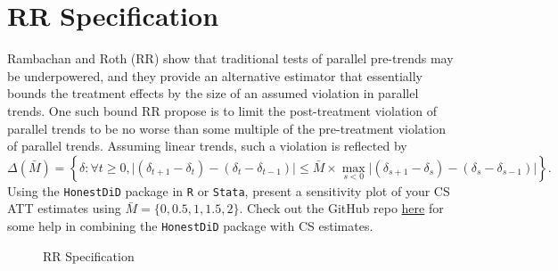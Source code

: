 \documentclass[
  12pt,
]{article}
\begin{document}
\newpage

\hypertarget{rr-specification}{%
\section{RR Specification}\label{rr-specification}}

Rambachan and Roth (RR) show that traditional tests of parallel
pre-trends may be underpowered, and they provide an alternative
estimator that essentially bounds the treatment effects by the size of
an assumed violation in parallel trends. One such bound RR propose is to
limit the post-treatment violation of parallel trends to be no worse
than some multiple of the pre-treatment violation of parallel trends.
Assuming linear trends, such a violation is reflected by
\[\Delta(\bar{M}) = \left\{ \delta : \forall t \geq 0, \lvert (\delta_{t+1} - \delta_{t}) - (\delta_{t} - \delta_{t-1}) \rvert \leq \bar{M} \times \max_{s<0} \lvert (\delta_{s+1} - \delta_{s}) - (\delta_{s} - \delta_{s-1}) \rvert \right\}.\]
Using the \texttt{HonestDiD} package in \texttt{R} or \texttt{Stata},
present a sensitivity plot of your CS ATT estimates using
\(\bar{M} = \{0, 0.5, 1, 1.5, 2\}\). Check out the GitHub repo
\href{https://github.com/pedrohcgs/CS_RR}{here} for some help in
combining the \texttt{HonestDiD} package with CS estimates.

\begin{figure}
\caption{RR Specification}\label{fig:Fig-6}
\end{figure}
\end{document}
